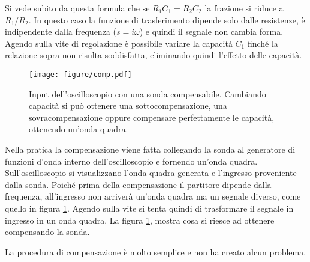 Si vede subito da questa formula che se $R_1C_1 = R_2C_2$ la frazione si riduce a $R_1/R_2$.
In questo caso la funzione di trasferimento dipende solo dalle resistenze, è indipendente dalla frequenza ($s = i\omega$)
e quindi il segnale non cambia forma. Agendo sulla vite di regolazione è possibile variare la capacità $C_1$
finché la relazione sopra non risulta soddisfatta, eliminando quindi l'effetto delle capacità.

\begin{figure}[t!]
    \centering
    \texttt{[image: figure/comp.pdf]}
    \caption{Input dell'oscilloscopio con una sonda compensabile. Cambiando capacità
        si può ottenere una sottocompensazione, una sovracompensazione oppure compensare perfettamente
        le capacità, ottenendo un'onda quadra.}
    \label{fig:compensazione8}
\end{figure}

Nella pratica la compensazione viene fatta collegando la sonda al generatore di funzioni d'onda interno dell'oscilloscopio
e fornendo un'onda quadra. Sull'oscilloscopio si visualizzano l'onda quadra generata e l'ingresso proveniente dalla sonda.
Poiché prima della compensazione il partitore dipende dalla frequenza, all'ingresso non arriverà un'onda quadra ma un
segnale diverso, come quello in figura \ref{fig:compensazione8}. Agendo sulla vite si tenta quindi di trasformare il
segnale in ingresso in un onda quadra. La figura \ref{fig:compensazione8}, mostra cosa si riesce ad ottenere compensando
la sonda.

La procedura di compensazione è molto semplice e non ha creato alcun problema.


